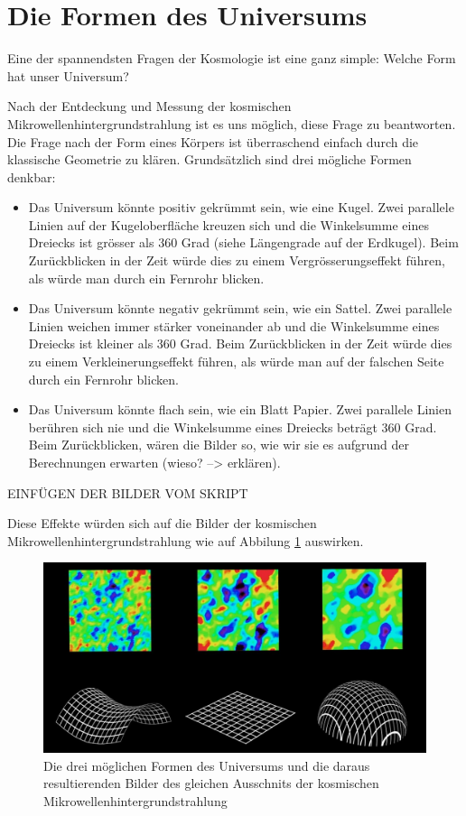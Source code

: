\section{Die Formen des Universums}
Eine der spannendsten Fragen der Kosmologie ist eine ganz simple: Welche Form 
hat unser Universum?

Nach der Entdeckung und Messung der kosmischen Mikrowellenhintergrundstrahlung 
ist es uns möglich, diese Frage zu beantworten.
Die Frage nach der Form eines Körpers ist überraschend einfach durch die 
klassische Geometrie zu klären.
Grundsätzlich sind drei mögliche Formen denkbar:
\begin{itemize}
	\item Das Universum könnte positiv gekrümmt sein, wie eine Kugel.
	Zwei parallele Linien auf der Kugeloberfläche kreuzen sich und die 
	Winkelsumme eines Dreiecks ist grösser als 360 Grad (siehe Längengrade auf der Erdkugel).
	Beim Zurückblicken in der Zeit würde dies zu einem Vergrösserungseffekt führen,
	als würde man durch ein Fernrohr blicken.
	\item Das Universum könnte negativ gekrümmt sein, wie ein Sattel.
	Zwei parallele Linien weichen immer stärker voneinander ab und die 
	Winkelsumme eines Dreiecks ist kleiner als 360 Grad.
	Beim Zurückblicken in der Zeit würde dies zu einem Verkleinerungseffekt führen,
	als würde man auf der falschen Seite durch ein Fernrohr blicken.
	\item Das Universum könnte flach sein, wie ein Blatt Papier.
	Zwei parallele Linien berühren sich nie und die Winkelsumme eines Dreiecks 
	beträgt 360 Grad.
	Beim Zurückblicken, wären die Bilder so, wie wir sie es aufgrund der Berechnungen erwarten (wieso? --> erklären).
\end{itemize}
EINFÜGEN DER BILDER VOM SKRIPT

Diese Effekte würden sich auf die Bilder der kosmischen Mikrowellenhintergrundstrahlung
wie auf Abbilung \ref{fig:universe_shapes} auswirken.

\begin{figure}
	\includegraphics[width=\linewidth]{cmb/images/universe_shapes.jpg}
	\caption{Die drei möglichen Formen des Universums und die daraus 
		resultierenden Bilder des gleichen Ausschnits der kosmischen
		Mikrowellenhintergrundstrahlung}
	\label{fig:universe_shapes}
\end{figure}
